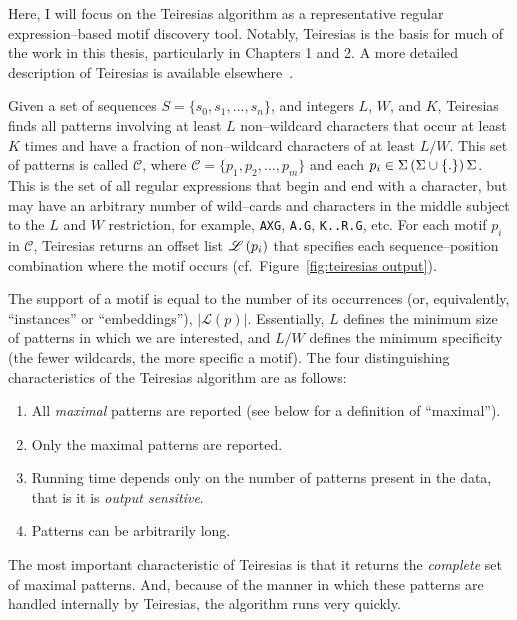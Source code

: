             Here, I will focus on the Teiresias algorithm as a representative
            regular expression--based motif discovery tool.
            Notably, Teiresias is the basis for much of the work in
            this thesis, particularly in Chapters 1 and 2.
            A more detailed description of Teiresias is available elsewhere~\cite{floratos1999pattern,rigoutsos1998combinatorial}.


            Given a set of sequences $S = \{ s_0,s_1,\ldots,s_n\}$,
            and integers $L$, $W$, and $K$, Teiresias finds all
            patterns involving at least $L$ non--wildcard characters
            that occur at least $K$ times and have a fraction of
            non--wildcard characters of at least $L/W$.  This set of
            patterns is called $\mathcal{C}$, where $\mathcal{C}=\{
            p_1,p_2,\ldots,p_m\}$ and each $p_i\in\Sigma\left(\Sigma\cup\left\{.\right\}\right)\Sigma$.
            This is the set of all regular expressions that begin
            and end with a character, but may have an arbitrary
            number of wild--cards and characters in the middle
            subject to the $L$ and $W$ restriction,
            for example, \texttt{AXG}, \texttt{A.G},
            \texttt{K..R.G}, etc.
            For
            each motif $p_i$ in $\mathcal{C}$, Teiresias returns an
            offset list $\mathscr{L}\left(p_i\right)$ that specifies each
            sequence--position combination where the motif occurs
            (cf.\ Figure~\vref{fig:teiresias output}).

            The support of a motif is equal to
            the number of its occurrences (or, equivalently, ``instances'' or ``embeddings''),
            $\vert \mathscr{L}(p) \vert$.
            Essentially,
            $L$ defines the minimum size of patterns in which we are
            interested, and $L/W$ defines the minimum specificity
            (the fewer wildcards, the more specific a motif).
            The four distinguishing characteristics of the Teiresias algorithm are as follows:
            \begin{enumerate}
                \item   All \emph{maximal} patterns are reported (see below for a definition of ``maximal'').
                \item   Only the maximal patterns are reported.
                \item   Running time depends only on the number of patterns present in
                        the data, that is it is \emph{output sensitive}.
                \item   Patterns can be arbitrarily long.
            \end{enumerate}
            The most important characteristic of Teiresias is that it returns the \emph{complete} set of maximal patterns.
            And, because of the manner in which these patterns are handled internally by Teiresias, the algorithm runs
            very quickly.

